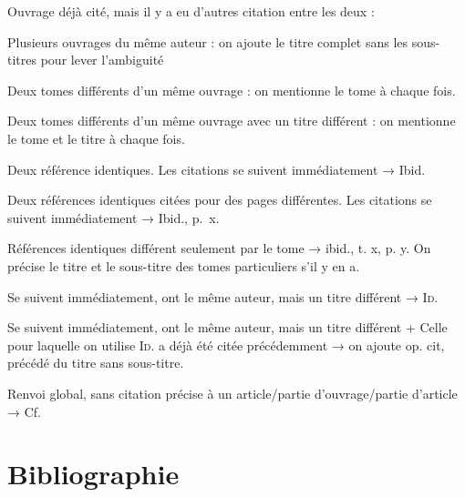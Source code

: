 Ouvrage déjà cité, mais il y a eu d'autres citation entre les deux :
\autocite[15]{poucet}\autocite{test}\autocite[31]{poucet}

\newpage
Plusieurs ouvrages du même auteur : on ajoute le titre complet sans les sous-titres pour lever l'ambiguité
\autocite[146]{genettemim}\autocite{test}\autocite[16--29]{genettefig}\autocite{test}\autocite[103]{genettemim}

\newpage
Deux tomes différents d'un même ouvrage : on mentionne le tome à chaque fois.
\autocite[103]{martin1}\autocite{test}\autocite[71]{martin2}

\newpage
Deux tomes différents d'un même ouvrage avec un titre différent : on mentionne le tome et le titre à chaque fois.
\autocite[115]{remond1}\autocite{test}\autocite{remond2}

\newpage
Deux référence identiques. Les citations se suivent immédiatement → Ibid.
\autocite[41--57]{leclerc}\autocite[41--57]{leclerc}

\newpage
Deux références identiques citées pour des pages différentes. Les citations se suivent immédiatement → Ibid., p.~x.
\autocite[105]{vouilloux}\autocite[80]{vouilloux}

\newpage
Références identiques différent seulement par le tome → ibid., t. x, p. y.
On précise le titre et le sous-titre des tomes particuliers s'il y en a.
\autocite[115]{remondx1}\autocite[45]{remondx2}

\newpage
Se suivent immédiatement, ont le même auteur, mais un titre différent → \textsc{Id.}
\autocite[197]{genettexmim}\autocite[91]{genettexfig}

\newpage
Se suivent immédiatement, ont le même auteur, mais un titre différent + Celle pour laquelle on utilise \textsc{Id.} a déjà été citée précédemment → on ajoute op. cit, précédé du titre sans sous-titre.
\autocite[79--93]{genetteyfig}\autocite[146]{genetteymim}\autocite[103]{genetteyfig}

\newpage
Renvoi global, sans citation précise à un article/partie d'ouvrage/partie d'article → Cf.
\autocite[Cf.][]{delatte}




\newpage
\section{Bibliographie}





\printbibliography





